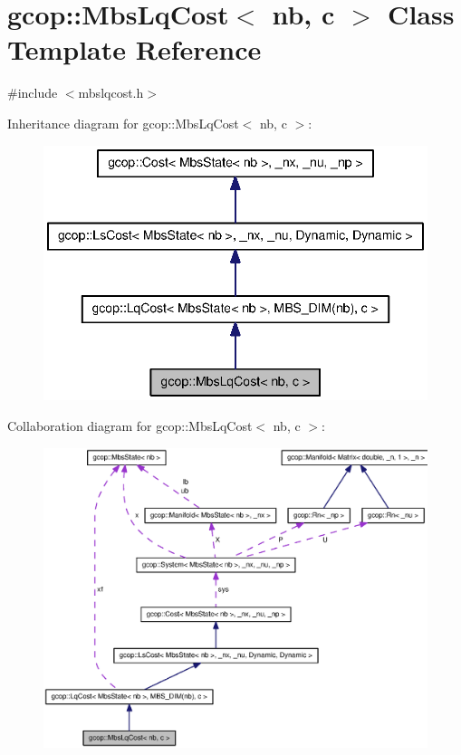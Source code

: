 \section{gcop\-:\-:\-Mbs\-Lq\-Cost$<$ nb, c $>$ \-Class \-Template \-Reference}
\label{classgcop_1_1MbsLqCost}


{\ttfamily \#include $<$mbslqcost.\-h$>$}



\-Inheritance diagram for gcop\-:\-:\-Mbs\-Lq\-Cost$<$ nb, c $>$\-:\nopagebreak
\begin{figure}[H]
\begin{center}
\leavevmode
\includegraphics[width=340pt]{classgcop_1_1MbsLqCost__inherit__graph}
\end{center}
\end{figure}


\-Collaboration diagram for gcop\-:\-:\-Mbs\-Lq\-Cost$<$ nb, c $>$\-:\nopagebreak
\begin{figure}[H]
\begin{center}
\leavevmode
\includegraphics[width=350pt]{classgcop_1_1MbsLqCost__coll__graph}
\end{center}
\end{figure}
